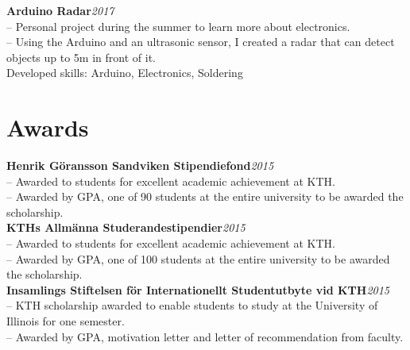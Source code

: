 \documentclass[10pt]{article}
\begin{document}
\noindent\textbf{Arduino Radar}\hfill\textit{2017} \\
\indent-- Personal project during the summer to learn more about electronics.\\
\indent-- Using the Arduino and an ultrasonic sensor, I created a radar that can detect objects up to 5m in front of it.\\
\indent Developed skills: Arduino, Electronics, Soldering\\

\section*{Awards}
\vspace{0.2em}
\hline
\vspace{0.5em}
\noindent\textbf{Henrik Göransson Sandviken Stipendiefond}\hfill\textit{2015}\\
\indent-- Awarded to students for excellent academic achievement at KTH.\\
\indent-- Awarded by GPA, one of 90 students at the entire university to be awarded the scholarship.\\

\noindent\textbf{KTHs Allmänna Studerandestipendier}\hfill\textit{2015}\\
\indent-- Awarded to students for excellent academic achievement at KTH.\\
\indent-- Awarded by GPA, one of 100 students at the entire university to be awarded the scholarship.\\

\noindent\textbf{Insamlings Stiftelsen för Internationellt Studentutbyte  vid KTH}\hfill\textit{2015}\\
\indent-- KTH scholarship awarded to enable students to study at the University of Illinois for one semester.\\
\indent-- Awarded by GPA, motivation letter and letter of recommendation from faculty.\\
\end{document}
